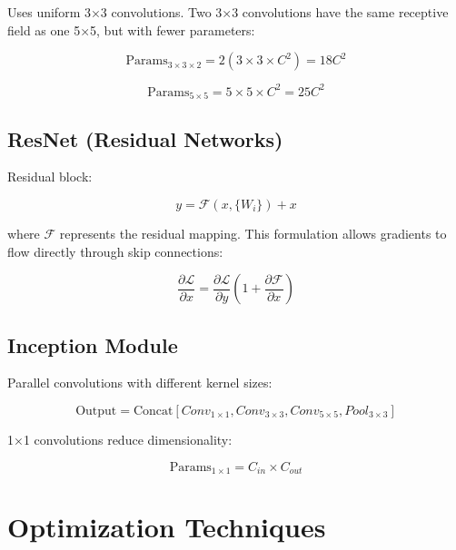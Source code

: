 \documentclass[12pt,a4paper]{article}
\begin{document}
Uses uniform 3×3 convolutions. Two 3×3 convolutions have the same receptive field as one 5×5, but with fewer parameters:

\begin{equation}
\text{Params}_{3 \times 3 \times 2} = 2(3 \times 3 \times C^2) = 18C^2
\end{equation}

\begin{equation}
\text{Params}_{5 \times 5} = 5 \times 5 \times C^2 = 25C^2
\end{equation}

\subsection{ResNet (Residual Networks)}

Residual block:

\begin{equation}
y = \mathcal{F}(x, \{W_i\}) + x
\end{equation}

where $\mathcal{F}$ represents the residual mapping. This formulation allows gradients to flow directly through skip connections:

\begin{equation}
\frac{\partial \mathcal{L}}{\partial x} = \frac{\partial \mathcal{L}}{\partial y} \left(1 + \frac{\partial \mathcal{F}}{\partial x}\right)
\end{equation}

\subsection{Inception Module}

Parallel convolutions with different kernel sizes:

\begin{equation}
\text{Output} = \text{Concat}[Conv_{1 \times 1}, Conv_{3 \times 3}, Conv_{5 \times 5}, Pool_{3 \times 3}]
\end{equation}

1×1 convolutions reduce dimensionality:

\begin{equation}
\text{Params}_{1 \times 1} = C_{in} \times C_{out}
\end{equation}

\section{Optimization Techniques}
\end{document}
